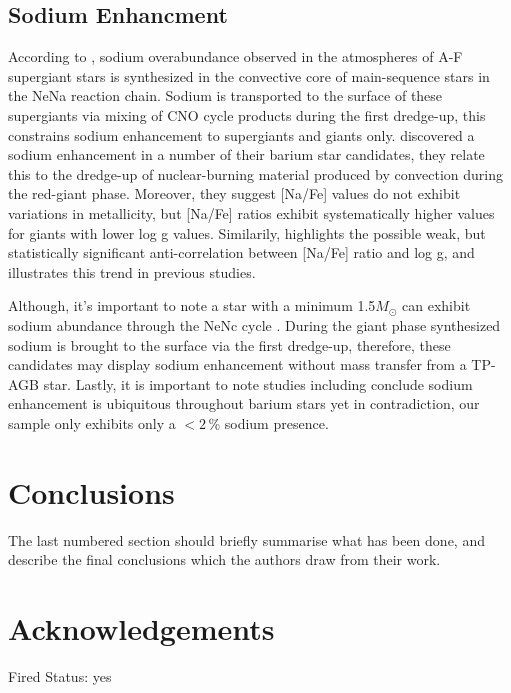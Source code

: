\documentclass[a4paper,fleqn,usenatbib]{mnras}
\begin{document}
\subsection{Sodium Enhancment}
According to \citet{el1995}, sodium overabundance observed in the atmospheres of A-F supergiant stars is synthesized in the convective core of main-sequence stars in the NeNa reaction chain. Sodium is transported to the surface of these supergiants via mixing of CNO cycle products during the first dredge-up, this constrains sodium enhancement to supergiants and giants only. \citet{antipova2004} discovered a sodium enhancement in a number of their barium star candidates, they relate this to the dredge-up of nuclear-burning material produced by convection during the red-giant phase. Moreover, they suggest [Na/Fe] values do not exhibit variations in metallicity, but [Na/Fe] ratios exhibit systematically higher values for giants with lower log g values. Similarily, \citet{decastro2016} highlights the possible weak, but statistically significant anti-correlation between [Na/Fe] ratio and log g, and illustrates this trend in previous studies\citep[e.g.][]{boyarchuk2002,mishenina2006,luck2007,takeda2008}. 

Although, it's important to note a star with a minimum 1.5$M_\odot$ can exhibit sodium abundance through the NeNc cycle \citep{denissenkov1987}. During the giant phase synthesized sodium is brought to the surface via the first dredge-up, therefore, these candidates may display sodium enhancement without mass transfer from a TP-AGB star. Lastly, it is important to note studies including \citet{decastro2016} conclude sodium enhancement is ubiquitous throughout barium stars yet in contradiction, our sample only exhibits only a $<2$\,\% sodium presence. 

\section{Conclusions} \label{sec:con}

The last numbered section should briefly summarise what has been done, and describe
the final conclusions which the authors draw from their work.

\section*{Acknowledgements}

Fired Status: yes
\end{document}
